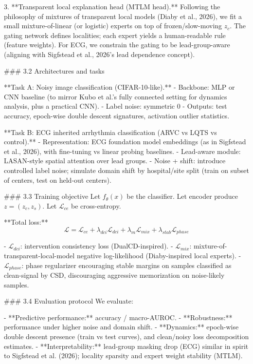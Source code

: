 3. **Transparent local explanation head (MTLM head).**  
   Following the philosophy of mixtures of transparent local models (Diaby et al., 2026), we fit a small mixture-of-linear (or logistic) experts on top of frozen/slow-moving \(z_c\). The gating network defines localities; each expert yields a human-readable rule (feature weights). For ECG, we constrain the gating to be lead-group-aware (aligning with Sigfstead et al., 2026’s lead dependence concept).

### 3.2 Architectures and tasks  

**Task A: Noisy image classification (CIFAR-10-like).**  
- Backbone: MLP or CNN baseline (to mirror Kubo et al.’s fully connected setting for dynamics analysis, plus a practical CNN).
- Label noise: symmetric 0%
- Outputs: test accuracy, epoch-wise double descent signatures, activation outlier statistics.

**Task B: ECG inherited arrhythmia classification (ARVC vs LQTS vs control).**  
- Representation: ECG foundation model embeddings (as in Sigfstead et al., 2026), with fine-tuning vs linear probing baselines.
- Lead-aware module: LASAN-style spatial attention over lead groups.
- Noise + shift: introduce controlled label noise; simulate domain shift by hospital/site split (train on subset of centers, test on held-out centers).

### 3.3 Training objective  
Let \(f_\theta(x)\) be the classifier. Let encoder produce \(z=(z_c,z_s)\). Let \(\mathcal{L}_{ce}\) be cross-entropy.

**Total loss:**
\[
\mathcal{L} = \mathcal{L}_{ce} + \lambda_{dci}\mathcal{L}_{dci} + \lambda_{m}\mathcal{L}_{mix} + \lambda_{stab}\mathcal{L}_{phase}
\]

- \(\mathcal{L}_{dci}\): intervention consistency loss (DualCD-inspired).
- \(\mathcal{L}_{mix}\): mixture-of-transparent-local-model negative log-likelihood (Diaby-inspired local experts).
- \(\mathcal{L}_{phase}\): phase regularizer encouraging stable margins on samples classified as clean-signal by CSD, discouraging aggressive memorization on noise-likely samples.

### 3.4 Evaluation protocol  
We evaluate:

- **Predictive performance:** accuracy / macro-AUROC.
- **Robustness:** performance under higher noise and domain shift.
- **Dynamics:** epoch-wise double descent presence (train vs test curves), and clean/noisy loss decomposition estimates.
- **Interpretability:** lead-group masking drop (ECG) similar in spirit to Sigfstead et al. (2026); locality sparsity and expert weight stability (MTLM).

